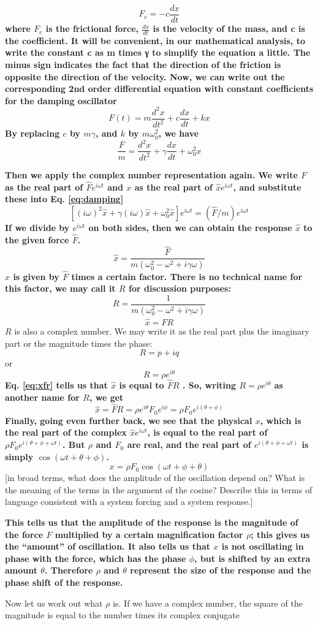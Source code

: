 \documentclass[]{revtex4}
\newcommand{\st}[1]{{\color{red}\bfseries #1}}
\begin{document}
\[F_c = -c\frac{dx}{dt}\]
\st{
  where $F_c$ is the frictional force, $\frac{dx}{dt}$ is the velocity of the mass, and c is the coefficient. It will be convenient, in our mathematical analysis, to write the constant c as m times γ to simplify the equation a little. The minus sign indicates the fact that the direction of the friction is opposite the direction of the velocity.
  Now, we can write out the corresponding 2nd order differential equation with constant coefficients for the damping oscillator 
}
\[ F(t) = m \frac{d^2x}{dt^2}+c\frac{dx}{dt}+ kx\label{eq:dkx}\]
\st{
  By replacing $c$ by $m\gamma$, and $k$ by $m\omega_0^2$, we have
}
\[ \frac{F}{m} = \frac{d^2x}{dt^2}+\gamma\frac{dx}{dt}+ \omega_0^2x \label{eq:damping}\]

\st{
  Then we apply the complex number representation again. We write $F$ as the real part of $\hat{F} e^{i \omega t}$ and $x$ as the real part of $\hat{x} e^{i \omega t}$, and substitute these into Eq. \eqref{eq:damping}
}
\[[(i\omega)^2\hat{x}+\gamma(i\omega)\hat{x}+\omega_0^2\hat{x}]e^{i\omega t}=(\widehat{F}/m)e^{i\omega t}\]
\st{
  If we divide by $e^{i \omega t}$ on both sides, then we can obtain the response $\hat{x}$ to the given force $\hat{F}$.
}
\[\hat{x} = \frac{\widehat{F}}{m(\omega_0^2-\omega^2+i\gamma\omega)} \label{eq:hatx}\]
\st{
  $\hat{x}$ is given by $\hat{F}$ times a certain factor. There is no technical name for this factor, we may call it $R$ for discussion purposes:
}
\[R = \frac{1}{m(\omega_0^2-\omega^2+i\gamma\omega)}\]
\[\hat{x} = \widehat{F}R \label{eq:xfr}\]
$R$ is also a complex number. We may write it as the real part plus the imaginary part or the magnitude times the phase:
\[R=p+iq\]
or
\[R=\rho e^{i\theta}\]
\st{
  Eq. \eqref{eq:xfr} tells us that $\hat{x}$ is equal to $\hat{F} R$ . So, writing $R=\rho e^{i\theta}$ as another name for $R$, we get
}
\[\hat{x} = \widehat{F}R=\rho e^{i\theta}F_0e^{i\phi}=\rho F_0e^{i(\theta+\phi)}\]
\st{
  Finally, going even further back, we see that the physical $x$, which is the real part of the complex $\hat{x} e^{i \omega t}$, is equal to the real part of $\rho F_0 e^{i(\theta+\phi+\omega t)}$. But $\rho$ and $F_0$ are real, and the real part of $e^{i(\theta+\phi+\omega t)}$ is simply $\cos(\omega t+\theta+\phi)$.
}
\[x = \rho F_0 \cos(\omega t + \phi + \theta)\]
[in broad terms, what does the amplitude of the oscillation depend on? What is the meaning of the terms in the argument of the cosine?
Describe this in terms of language consistent with a system forcing and a system response.]
\st{
  This tells us that the amplitude of the response is the magnitude of the force $F$ multiplied by a certain magnification factor $\rho$; this gives us the “amount” of oscillation. It also tells us that $x$ is not oscillating in phase with the force, which has the phase $\phi$, but is shifted by an extra amount $\theta$. Therefore $\rho$ and $\theta$ represent the size of the response and the phase shift of the response.
  
  Now let us work out what $\rho$ is. If we have a complex number, the square of the magnitude is equal to the number times its complex conjugate
}
\end{document}
